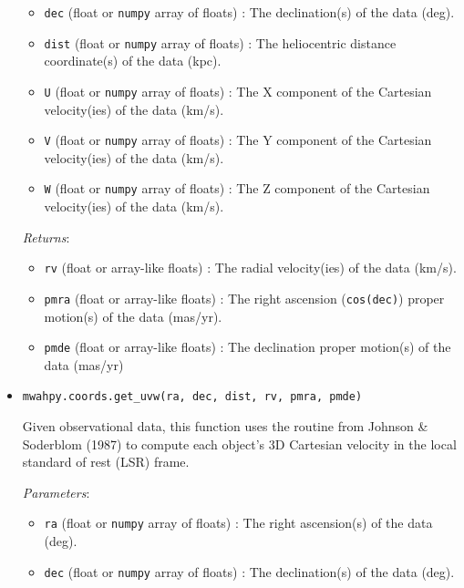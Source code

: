 \documentclass{article}
\begin{document}
\begin{itemize}
\begin{itemize}
\item \verb!dec! (float or \verb!numpy! array of floats) : The declination(s) of the data (deg).

\item \verb!dist! (float or \verb!numpy! array of floats) : The heliocentric distance coordinate(s) of the data (kpc).

\item \verb!U! (float or \verb!numpy! array of floats) : The X component of the Cartesian velocity(ies) of the data (km/s).

\item \verb!V! (float or \verb!numpy! array of floats) : The Y component of the Cartesian velocity(ies) of the data (km/s).

\item \verb!W! (float or \verb!numpy! array of floats) : The Z component of the Cartesian velocity(ies) of the data (km/s).

\end{itemize}

\textit{Returns}: \begin{itemize}

\item \verb!rv! (float or array-like floats) : The radial velocity(ies) of the data (km/s).

\item \verb!pmra! (float or array-like floats) : The right ascension (\verb!cos(dec)!) proper motion(s) of the data (mas/yr).

\item \verb!pmde! (float or array-like floats) : The declination proper motion(s) of the data (mas/yr)

\end{itemize}



\item \verb!mwahpy.coords.get_uvw(ra, dec, dist, rv, pmra, pmde)!

Given observational data, this function uses the routine from Johnson \& Soderblom (1987) to compute each object's 3D Cartesian velocity in the local standard of rest (LSR) frame.

\textit{Parameters}: \begin{itemize}

\item \verb!ra! (float or \verb!numpy! array of floats) : The right ascension(s) of the data (deg).

\item \verb!dec! (float or \verb!numpy! array of floats) : The declination(s) of the data (deg).


\end{itemize}
\end{itemize}
\end{document}
